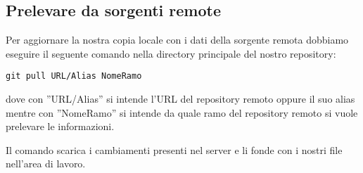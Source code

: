 \subsection{Prelevare da sorgenti remote}
Per aggiornare la nostra copia locale con i dati della sorgente remota dobbiamo eseguire il seguente comando nella directory principale del nostro repository:

\begin{center}
\texttt{git pull URL/Alias NomeRamo}
\end{center}

dove con ''URL/Alias'' si intende l'URL del repository remoto oppure il suo alias mentre con ''NomeRamo'' si intende da quale ramo del repository remoto si vuole prelevare le informazioni.

Il comando scarica i cambiamenti presenti nel server e li fonde con i nostri file nell'area di lavoro.
